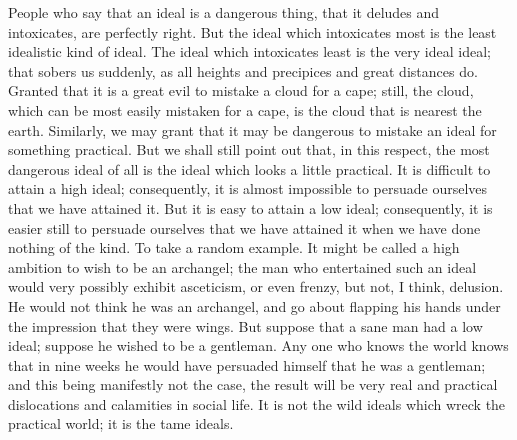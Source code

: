 People who say that an ideal is a dangerous thing, that it deludes and intoxicates, are perfectly right. But the ideal which intoxicates most is the least idealistic kind of ideal. The ideal which intoxicates least is the very ideal ideal; that sobers us suddenly, as all heights and precipices and great distances do. Granted that it is a great evil to mistake a cloud for a cape; still, the cloud, which can be most easily mistaken for a cape, is the cloud that is nearest the earth. Similarly, we may grant that it may be dangerous to mistake an ideal for something practical. But we shall still point out that, in this respect, the most dangerous ideal of all is the ideal which looks a little practical. It is difficult to attain a high ideal; consequently, it is almost impossible to persuade ourselves that we have attained it. But it is easy to attain a low ideal; consequently, it is easier still to persuade ourselves that we have attained it when we have done nothing of the kind. To take a random example. It might be called a high ambition to wish to be an archangel; the man who entertained such an ideal would very possibly exhibit asceticism, or even frenzy, but not, I think, delusion. He would not think he was an archangel, and go about flapping his hands under the impression that they were wings. But suppose that a sane man had a low ideal; suppose he wished to be a gentleman. Any one who knows the world knows that in nine weeks he would have persuaded himself that he was a gentleman; and this being manifestly not the case, the result will be very real and practical dislocations and calamities in social life. It is not the wild ideals which wreck the practical world; it is the tame ideals.

